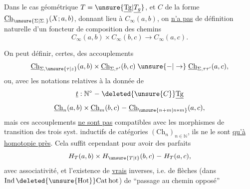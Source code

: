 
Dans le cas géométrique $T=\unsure{\underline{\mathrm{Tg}}|\underline{T_g}}$, et  $C$ de la forme $\underline{\mathrm{Ch}}_{\unsure{\Sigma|\Sigma_{\cdot}}}(X;a,b)$, donnant lieu à $C_\infty(a,b)$, on \uline{n'a pas} de définition naturelle d'un foncteur de composition des chemins
\[
C_\infty(a,b)\times C_\infty(b,c)\longrightarrow C_\infty(a,c).
\]

On peut définir, certes, des accouplements
\[
\underline{\mathrm{Ch}}_{\Sigma,\unsure{\tau|z}}(a,b)\times
\underline{\mathrm{Ch}}_{\Sigma,\tau'}(b,c)\mathrel{\unsure{-|\to}}
\underline{\mathrm{Ch}}_{\Sigma,\tau\tau'}(a,c),
\]
 ou, avec les notations relatives à la donnée de
\[
\underline{t}:\mathbb N^\circ\mathrel{-}\deleted{\unsure{C}}\underline{\mathrm{Tg}}
\]
\[
\underline{\mathrm{Ch}}_n(a,b)\times\underline{\mathrm{Ch}}_m(b,c)\mathrel{-}
\underline{\mathrm{Ch}}_{\unsure{n+m|n*m}}(a,c),
\]
mais ces accouplements \uline{ne sont pas} compatibles avec les morphismes de transition des trois syst. inductifs de catégories $(\mathrm{Ch}_n)_{n\in\mathbb N}$, ils ne le sont \uline{qu'à homotopie près}. Cela suffit cependant pour avoir des  parfaits
\[
H_T(a,b)\times H_{\unsure{T|t}}(b,c)\mathrel{-}H_T(a,c),
\]
avec associativité, et  l'existence de \uline{vrais} inverses, i.e. de  flèches (dans $\mathrm{Ind}\,\deleted{\unsure{\mathrm{Hot}}}\mathrm{Cat\,hot}$) de ``passage au chemin opposé''
